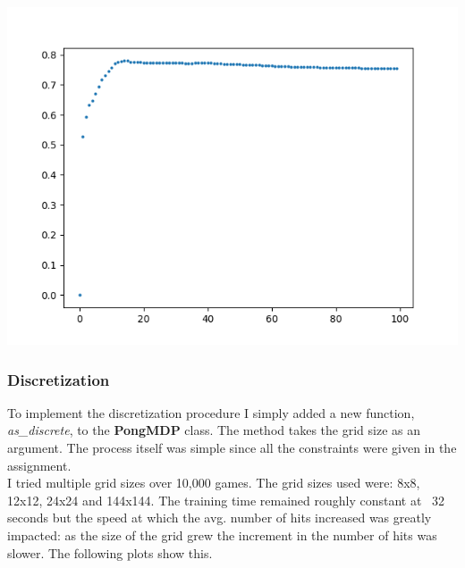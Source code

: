 \documentclass[11pt]{article}
\begin{document}
\begin{center}
\includegraphics[scale=1]{part2.1/antithetic-std-0-2.png}
\end{center}

\subsubsection*{Discretization}
To implement the discretization procedure I simply added a new function, \textit{as\_discrete}, to the \textbf{PongMDP} class. The method takes the grid size as an argument. The process itself was simple since all the constraints were given in the assignment. \\

I tried multiple grid sizes over 10,000 games. The grid sizes used were: 8x8, 12x12, 24x24 and 144x144. The training time remained roughly constant at ~32 seconds but the speed at which the avg. number of hits increased was greatly impacted: as the size of the grid grew the increment in the number of hits was slower. The following plots show this.
\end{document}
